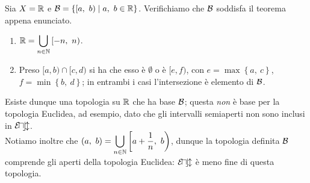 \begin{example}
Sia $X=\mathbb{R}$ e $\basis=\left\{[a,\ b)\mid a,\ b\in\realset\right\}$. Verifichiamo che $\mathcal{B}$ soddisfa il teorema appena enunciato.
\begin{enumerate}
\item $\displaystyle\mathbb{R}=\bigcup_{n\in \mathbb{N}}\left[-n,\ n\right)$.
\item Preso $[a, b)\cap[c, d)$ si ha che esso è $\emptyset$ o è $[e, f)$, con $e=\max\left\{a,\ c\right\}$, $f=\min\left\{b,\ d\right\}$; in entrambi i casi l'intersezione è elemento di $\mathcal{B}$.
\end{enumerate}
Esiste dunque una topologia su $\mathbb{R}$ che ha base $\mathcal{B}$; questa \textit{non} è base per la topologia Euclidea, ad esempio, dato che gli intervalli semiaperti non sono inclusi in $\mathcal{E\! u\! c\! l}$.\\
Notiamo inoltre che $\displaystyle\left(a,\ b\right)=\bigcup_{n\in \naturalset}\left[a+\frac{1}{n},\ b\right)$, dunque la topologia definita $\mathcal{B}$ comprende gli aperti della topologia Euclidea: $\mathcal{E\! u\! c\! l}$ è meno fine di questa topologia.
\end{example}

